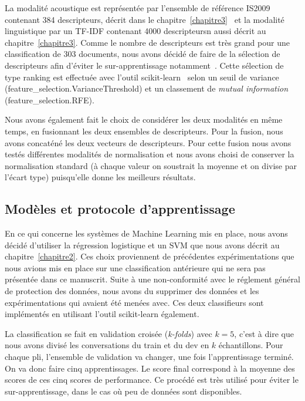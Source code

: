

La modalité acoustique est représentée par l'ensemble de référence IS2009 contenant 384 descripteurs, décrit dans le chapitre~\ref{chapitre3}~\cite{OPENSMILE} et la modalité linguistique par un TF-IDF contenant 4000 descripteursn aussi décrit au chapitre~\ref{chapitre3}. Comme le nombre de descripteurs est très grand pour une classification de 303 documents, nous avons décidé de faire de la sélection de descripteurs afin d'éviter le sur-apprentissage notamment~\cite{Tahon2016}. Cette sélection de type ranking est effectuée avec l'outil scikit-learn~\cite{scikitlearn} selon un seuil de variance (feature\_selection.VarianceThreshold) et un classement de \textit{mutual information} (feature\_selection.RFE).

Nous avons également fait le choix de considérer les deux modalités en même temps, en fusionnant les deux ensembles de descripteurs. Pour la fusion, nous avons concaténé les deux vecteurs de descripteurs. Pour cette fusion nous avons testés différentes modalités de normalisation et nous avons choisi de conserver la normalisation standard (à chaque valeur on soustrait la moyenne et on divise par l'écart type) puisqu'elle donne les meilleurs résultats.

\subsection{Modèles et protocole d'apprentissage}
En ce qui concerne les systèmes de Machine Learning mis en place, nous avons décidé d'utiliser la régression logistique et un SVM que nous avons décrit au chapitre~\ref{chapitre2}. Ces choix proviennent de précédentes expérimentations que nous avions mis en place sur une classification antérieure qui ne sera pas présentée dans ce manuscrit. Suite à une non-conformité avec le réglement général de protection des données, nous avons du supprimer des données et les expérimentations qui avaient été menées avec. Ces deux classifieurs sont implémentés en utilisant l'outil scikit-learn également. %

La classification se fait en validation croisée (\textit{k-folds}) avec $k=5$, c'est à dire que nous avons divisé les conversations du train et du dev en $k$ échantillons. Pour chaque pli, l'ensemble de validation va changer, une fois l'apprentissage terminé. On va donc faire cinq apprentissages. Le score final correspond à la moyenne des scores de ces cinq scores de performance. Ce procédé est très utilisé pour éviter le sur-apprentissage, dans le cas où peu de données sont disponibles.

